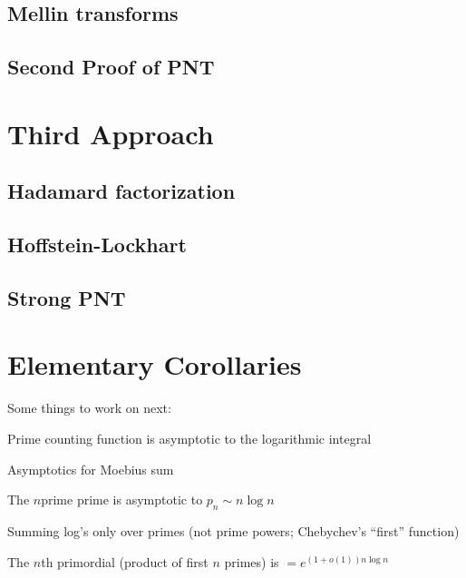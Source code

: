\documentclass{report}
\theoremstyle{definition}
\begin{document}
\section{Mellin transforms}


\section{Second Proof of PNT}



\chapter{Third Approach}

\section{Hadamard factorization}


\section{Hoffstein-Lockhart}


\section{Strong PNT}


\chapter{Elementary Corollaries}

Some things to work on next:

Prime counting function is asymptotic to the logarithmic integral

Asymptotics for Moebius sum

The $n$prime prime is asymptotic to $p_n \sim n \log n$

Summing log's only over primes (not prime powers; Chebychev's ``first'' function)

The $n$th primordial (product of first $n$ primes) is $=e^{(1+o(1))n\log n}$
\end{document}

